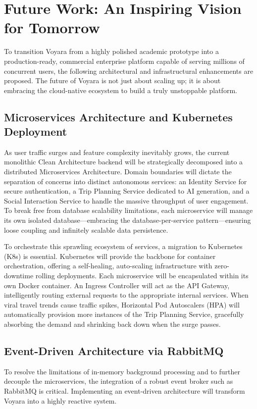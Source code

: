 \section{Future Work: An Inspiring Vision for Tomorrow}
To transition Voyara from a highly polished academic prototype into a production-ready, commercial enterprise platform capable of serving millions of concurrent users, the following architectural and infrastructural enhancements are proposed. The future of Voyara is not just about scaling up; it is about embracing the cloud-native ecosystem to build a truly unstoppable platform.

\subsection{Microservices Architecture and Kubernetes Deployment}
As user traffic surges and feature complexity inevitably grows, the current monolithic Clean Architecture backend will be strategically decomposed into a distributed Microservices Architecture. Domain boundaries will dictate the separation of concerns into distinct autonomous services: an Identity Service for secure authentication, a Trip Planning Service dedicated to AI generation, and a Social Interaction Service to handle the massive throughput of user engagement. To break free from database scalability limitations, each microservice will manage its own isolated database---embracing the database-per-service pattern---ensuring loose coupling and infinitely scalable data persistence.

To orchestrate this sprawling ecosystem of services, a migration to Kubernetes (K8s) is essential. Kubernetes will provide the backbone for container orchestration, offering a self-healing, auto-scaling infrastructure with zero-downtime rolling deployments. Each microservice will be encapsulated within its own Docker container. An Ingress Controller will act as the API Gateway, intelligently routing external requests to the appropriate internal services. When viral travel trends cause traffic spikes, Horizontal Pod Autoscalers (HPA) will automatically provision more instances of the Trip Planning Service, gracefully absorbing the demand and shrinking back down when the surge passes.

\subsection{Event-Driven Architecture via RabbitMQ}
To resolve the limitations of in-memory background processing and to further decouple the microservices, the integration of a robust event broker such as RabbitMQ is critical. Implementing an event-driven architecture will transform Voyara into a highly reactive system.


